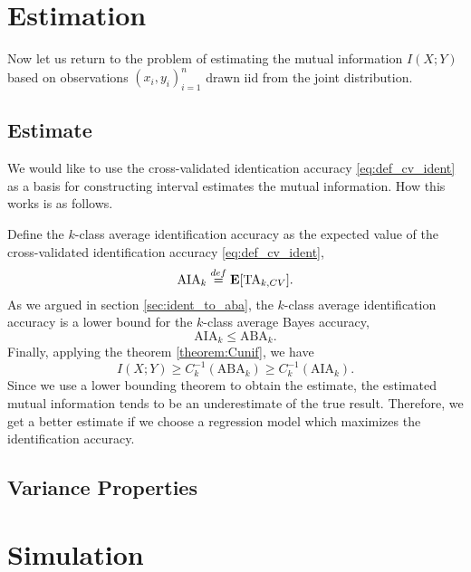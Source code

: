 \section{Estimation}\label{sec:ch4_estimation}

Now let us return to the problem of estimating the mutual information
$I(X; Y)$ based on observations $(x_i, y_i)_{i=1}^n$ drawn iid from
the joint distribution.

\subsection{Estimate}

We would like to use the cross-validated identication accuracy
\eqref{eq:def_cv_ident} as a basis for constructing interval estimates
the mutual information.  How this works is as follows.

Define the $k$-class average identification accuracy as the expected
value of the cross-validated identification accuracy \eqref{eq:def_cv_ident},
\[
\text{AIA}_k \stackrel{def}{=} \textbf{E}[\text{TA}_{k, CV}].
\]
As we argued in section \ref{sec:ident_to_aba}, the $k$-class average identification accuracy
is a lower bound for the $k$-class average Bayes accuracy,
\[
\text{AIA}_k \leq \text{ABA}_k.
\]
Finally, applying the theorem \ref{theorem:Cunif}, we have
\[
I(X; Y) \geq C^{-1}_k(\text{ABA}_k) \geq C^{-1}_k(\text{AIA}_k).
\]
Since we use a lower bounding theorem to obtain the estimate, the
estimated mutual information tends to be an underestimate of the true
result.  Therefore, we get a better estimate if we choose a regression
model which maximizes the identification accuracy.



\subsection{Variance Properties}




\section{Simulation}\label{sec:ch4_simulation}

